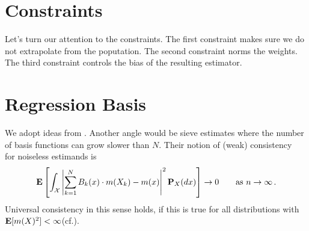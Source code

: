 \section*{Constraints}
Let's turn our attention to the constraints.
The first constraint makes sure we do not extrapolate from the poputation.
The second constraint norms the weights. 
The third constraint controls the bias of the resulting estimator.
\section*{Regression Basis}
We adopt ideas from \cite{Gyorfi2002}. Another angle would be sieve estimates\cite{Newey1997a} where the number of basis functions can grow slower than $N$.
Their notion of (weak) consistency~\cite[Definitien~1.1]{Gyorfi2002} for noiseless estimands
is
\begin{gather}
  \E
  \left[ 
    \int_\mathcal{X}
    \left| 
    \sum_{k=1}^{N} 
    B_k(x)
    \cdot
    m(X_k)
    -
    m(x)
    \right|
    ^2
    \P_X(dx)
  \right]
  \to
  0
  \qquad
  \text{as}
  \ 
  n\to \infty
  \,.
\end{gather}
Universal consistency in this sense holds, if this is true for all distributions with
$\mathbf{E}[m(X)^2]<\infty$(cf.\cite[Definition~1.3]{Gyorfi2002}).

